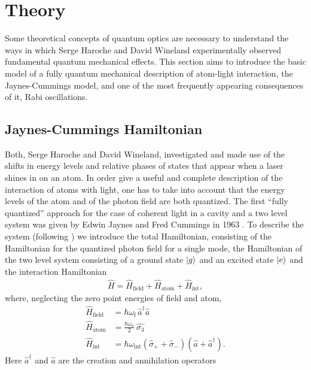 \section{Theory}
\label{sec:Theory}
Some theoretical concepts of quantum optics are necessary to understand the ways
in which Serge Haroche and David Wineland experimentally observed fundamental
quantum mechanical effects. This section aims to introduce the basic model of a
fully quantum mechanical description of atom-light interaction, the Jaynes-Cummings model, and
one of the most frequently appearing consequences of it, Rabi oscillations.

\subsection{Jaynes-Cummings Hamiltonian}
Both, Serge Haroche and David Wineland, investigated and made use of the
shifts in energy levels and relative phases of states that appear when a laser
shines in on an atom.  In
order give a useful and complete description of the interaction of atoms with
light, one has to take into
account that the energy levels of the atom and of the photon field are
both quantized. The first ``fully quantized'' approach for the case of coherent light
in a cavity and a two level system was given by Edwin Jaynes and Fred Cummings
in 1963 \cite{jaynes1963comparison}. To describe the system (following
\cite{gerry2005introductory}) 
we introduce the total Hamiltonian, consisting of the Hamiltonian for the 
 quantized photon field for a single mode, the Hamiltonian of the two level
 system consisting of a ground state $\ket{g}$ and an excited state $\ket{e}$ and the
 interaction Hamiltonian
\begin{align}
  \label{eq:JCM_H_tot}
  {\hat {H}}={\hat {H}}_{{{\text{field}}}}+{\hat {H}}_{{{\text{atom}}}}+{\hat
  {H}}_{{{\text{int}}}},
\end{align}
where, neglecting the zero point energies of field and atom,
\begin{align}
  \label{eq:JCM_H_field}
  \hat{H}_{\text{field}} &= \hbar \omega_{\text{f}}\, \hat{a}^\dagger
   \hat{a}\\
  \label{eq:JCM_H_atom}
  \hat{H}_{\text{atom}} &= \frac{\hbar \omega_a}{2} \, \hat{\sigma_3} \\
  \label{eq:JCM_H_int}
  \hat{H}_{\text{int}} &= \hbar \omega_{\text{int}} \left( \hat{\sigma}_+ +
\hat{\sigma}_-\right)\left(\hat{a} + \hat{a}^\dagger\right).
\end{align}
Here $\hat{a}^\dagger$ and $\hat{a}$ are the creation and annihilation operators
